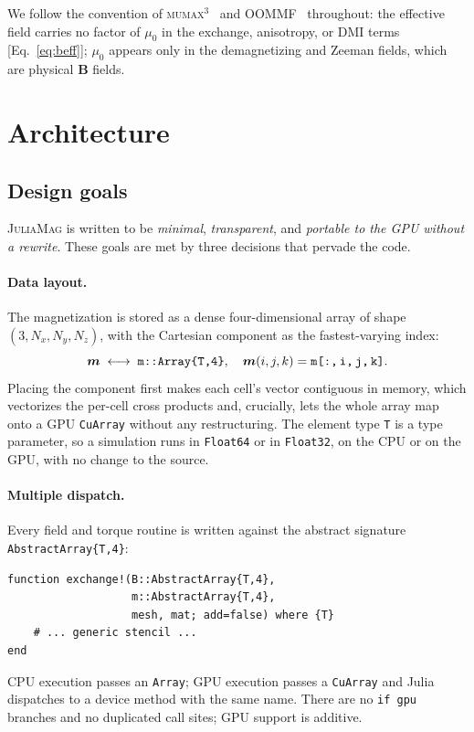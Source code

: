 \documentclass{article}      %
\newcommand{\JuliaMag}{\textsc{JuliaMag}}
\newcommand{\mumax}{\textsc{mumax}$^3$}
\newcommand{\oommf}{\textsc{OOMMF}}
\newcommand{\vm}{\bm{m}}
\begin{document}
We follow the convention of \mumax{}~\cite{mumax3} and \oommf{}~\cite{oommf}
throughout: the effective field carries no factor of $\mu_0$ in the exchange,
anisotropy, or DMI terms [Eq.~\eqref{eq:beff}]; $\mu_0$ appears only in the
demagnetizing and Zeeman fields, which are physical $\bm{B}$ fields.

\section{Architecture}
\label{sec:arch}

\subsection{Design goals}

\JuliaMag{} is written to be \emph{minimal}, \emph{transparent}, and
\emph{portable to the GPU without a rewrite}. These goals are met by three
decisions that pervade the code.

\paragraph{Data layout.}
The magnetization is stored as a dense four-dimensional array of shape
$(3, N_x, N_y, N_z)$, with the Cartesian component as the fastest-varying index:
%
\begin{equation}
  \vm \;\longleftrightarrow\; \texttt{m::Array\{T,4\}}, \quad
  \vm(i,j,k) = \texttt{m[:,\,i,\,j,\,k]}.
\end{equation}
%
Placing the component first makes each cell's vector contiguous in memory, which
vectorizes the per-cell cross products and, crucially, lets the whole array map
onto a GPU \texttt{CuArray} without any restructuring. The element type \texttt{T}
is a type parameter, so a simulation runs in \texttt{Float64} or in
\texttt{Float32}, on the CPU or on the GPU, with no change to the source.

\paragraph{Multiple dispatch.}
Every field and torque routine is written against the abstract signature
\texttt{AbstractArray\{T,4\}}:
%
\begin{lstlisting}
function exchange!(B::AbstractArray{T,4},
                   m::AbstractArray{T,4},
                   mesh, mat; add=false) where {T}
    # ... generic stencil ...
end
\end{lstlisting}
%
CPU execution passes an \texttt{Array}; GPU execution passes a \texttt{CuArray}
and Julia dispatches to a device method with the same name. There are no
\texttt{if gpu} branches and no duplicated call sites; GPU support is additive.
\end{document}
